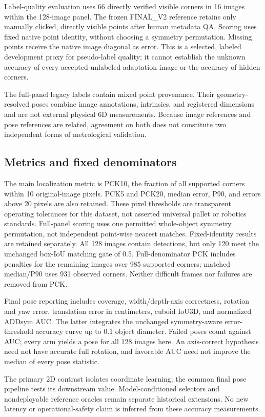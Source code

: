\documentclass[journal]{IEEEtran}
\begin{document}
Label-quality evaluation uses 66 directly verified visible corners in 16 images within the 128-image panel. The frozen FINAL\_V2 reference retains only manually clicked, directly visible points after human metadata QA. Scoring uses fixed native point identity, without choosing a symmetry permutation. Missing points receive the native image diagonal as error. This is a selected, labeled development proxy for pseudo-label quality; it cannot establish the unknown accuracy of every accepted unlabeled adaptation image or the accuracy of hidden corners.

The full-panel legacy labels contain mixed point provenance. Their geometry-resolved poses combine image annotations, intrinsics, and registered dimensions and are not external physical 6D measurements. Because image references and pose references are related, agreement on both does not constitute two independent forms of metrological validation.

\subsection{Metrics and fixed denominators}
The main localization metric is PCK10, the fraction of all supported corners within 10 original-image pixels. PCK5 and PCK20, median error, P90, and errors above 20 pixels are also retained. These pixel thresholds are transparent operating tolerances for this dataset, not asserted universal pallet or robotics standards. Full-panel scoring uses one permitted whole-object symmetry permutation, not independent point-wise nearest matches. Fixed-identity results are retained separately. All 128 images contain detections, but only 120 meet the unchanged box-IoU matching gate of 0.5. Full-denominator PCK includes penalties for the remaining images over 985 supported corners; matched median/P90 uses 931 observed corners. Neither difficult frames nor failures are removed from PCK.

Final pose reporting includes coverage, width/depth-axis correctness, rotation and yaw error, translation error in centimeters, cuboid IoU3D, and normalized ADDsym AUC. The latter integrates the unchanged symmetry-aware error-threshold accuracy curve up to 0.1 object diameter. Failed poses count against AUC; every arm yields a pose for all 128 images here. An axis-correct hypothesis need not have accurate full rotation, and favorable AUC need not improve the median of every pose statistic.

The primary 2D contrast isolates coordinate learning; the common final pose pipeline tests its downstream value. Model-conditioned selectors and nondeployable reference oracles remain separate historical extensions. No new latency or operational-safety claim is inferred from these accuracy measurements.
\end{document}
